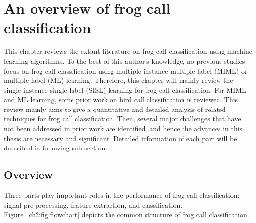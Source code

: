 
\chapter[Literature review]{An overview of frog call classification}
\label{cha:cha2LiteratureReview}

This chapter reviews the extant literature on frog call classification using machine learning algorithms. To the best of this author's knowledge, no previous studies focus on frog call classification using multiple-instance multiple-label (MIML) or multiple-label (ML) learning. Therefore, this chapter will mainly review the single-instance single-label (SISL) learning for frog call classification. For MIML and ML learning, some prior work on bird call classification is reviewed. This review mainly aims to give a quantitative and detailed analysis of related techniques for frog call classification. 
Then, several major challenges that have not been addressed in prior work are identified, and hence the advances in this thesis are necessary and significant. Detailed information of each part will be described in following sub-section.

\section{Overview}
Three parts play important roles in the performance of frog call classification: signal pre-processing, feature extraction, and classification. Figure~\ref{ch2:fig:flowchart} depicts the common structure of frog call classification.

